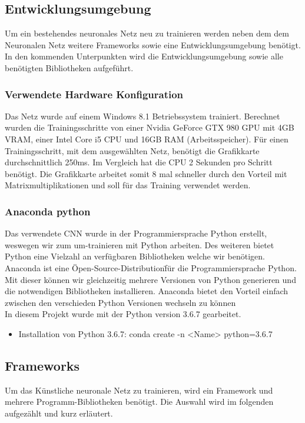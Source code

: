 \documentclass[a4paper,12pt,oneside]{article}
\begin{document}
\subsection{Entwicklungsumgebung}
Um ein bestehendes neuronales Netz neu zu trainieren werden neben dem dem Neuronalen Netz weitere Frameworks sowie eine Entwicklungsumgebung benötigt. In den kommenden Unterpunkten wird die Entwicklungsumgebung sowie alle benötigten Bibliotheken aufgeführt. 

  \subsubsection{Verwendete Hardware Konfiguration}
Das Netz wurde auf einem Windows 8.1 Betriebssystem trainiert. Berechnet wurden die Trainingsschritte von einer Nvidia GeForce GTX 980 GPU mit 4GB VRAM, einer Intel Core i5 CPU und 16GB RAM (Arbeitsspeicher). Für einen Trainingsschritt, mit dem ausgewählten Netz, benötigt die Grafikkarte durchschnittlich 250ms. Im Vergleich hat die CPU 2 Sekunden pro Schritt benötigt. Die Grafikkarte arbeitet somit 8 mal schneller durch den Vorteil mit Matrixmultiplikationen und soll für das Training verwendet werden.

  \subsubsection{Anaconda python}
Das verwendete CNN wurde in der Programmiersprache Python erstellt, weswegen wir zum um-trainieren mit Python arbeiten. Des weiteren bietet Python eine Vielzahl an verfügbaren Bibliotheken welche wir benötigen. Anaconda ist eine \"Open-Source-Distribution\" für die Programmiersprache Python. Mit dieser können wir gleichzeitig mehrere Versionen von Python generieren und die notwendigen Bibliotheken installieren. Anaconda bietet den Vorteil einfach zwischen den verschieden Python Versionen wechseln zu können \\
In diesem Projekt wurde mit der Python version 3.6.7 gearbeitet.

  \begin{itemize}
	\item Installation von Python 3.6.7: conda create -n <Name> python=3.6.7
  \end{itemize}
  
  \subsection{Frameworks}
Um das Künstliche neuronale Netz zu trainieren, wird ein Framework und mehrere Programm-Bibliotheken benötigt. Die Auswahl wird im folgenden aufgezählt und kurz erläutert.
 
\end{document}
